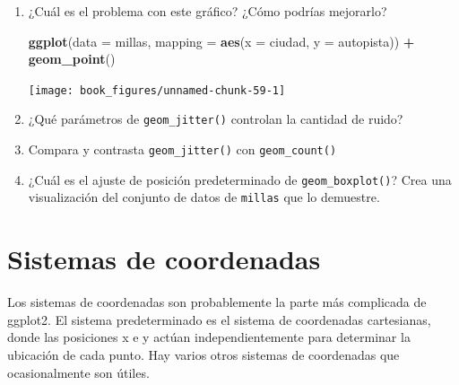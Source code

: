 \documentclass[11pt,oneside]{report}
\newenvironment{Shaded}{\begin{snugshade}}{\end{snugshade}}
\newcommand{\DataTypeTok}[1]{\textcolor[rgb]{0.13,0.29,0.53}{#1}}
\newcommand{\KeywordTok}[1]{\textcolor[rgb]{0.13,0.29,0.53}{\textbf{#1}}}
\newcommand{\NormalTok}[1]{#1}
\newcommand{\OperatorTok}[1]{\textcolor[rgb]{0.81,0.36,0.00}{\textbf{#1}}}
\newcommand{\StringTok}[1]{\textcolor[rgb]{0.31,0.60,0.02}{#1}}
\begin{document}
\begin{enumerate}
\def\labelenumi{\arabic{enumi}.}
\item
  ¿Cuál es el problema con este gráfico? ¿Cómo podrías mejorarlo?

\begin{Shaded}
\begin{Highlighting}[]
\KeywordTok{ggplot}\NormalTok{(}\DataTypeTok{data =}\NormalTok{ millas, }\DataTypeTok{mapping =} \KeywordTok{aes}\NormalTok{(}\DataTypeTok{x =}\NormalTok{ ciudad, }\DataTypeTok{y =}\NormalTok{ autopista)) }\OperatorTok{+}
\StringTok{  }\KeywordTok{geom_point}\NormalTok{()}
\end{Highlighting}
\end{Shaded}

  \begin{center}\texttt{[image: book\_figures/unnamed-chunk-59-1]} \end{center}
\item
  ¿Qué parámetros de \texttt{geom\_jitter()} controlan la cantidad de
  ruido?
\item
  Compara y contrasta \texttt{geom\_jitter()} con \texttt{geom\_count()}
\item
  ¿Cuál es el ajuste de posición predeterminado de
  \texttt{geom\_boxplot()}? Crea una visualización del conjunto de datos
  de \texttt{millas} que lo demuestre.
\end{enumerate}

\hypertarget{sistemas-de-coordenadas}{%
\section{Sistemas de coordenadas}\label{sistemas-de-coordenadas}}

Los sistemas de coordenadas son probablemente la parte más complicada de
ggplot2. El sistema predeterminado es el sistema de coordenadas
cartesianas, donde las posiciones x e y actúan independientemente para
determinar la ubicación de cada punto. Hay varios otros sistemas de
coordenadas que ocasionalmente son útiles.
\end{document}
